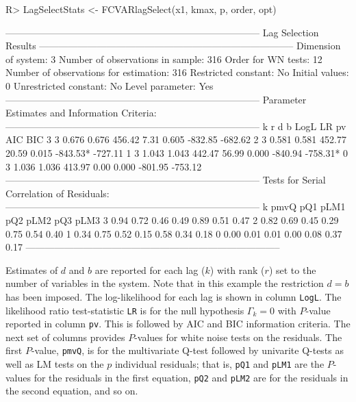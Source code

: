 \documentclass[article]{jss}
\begin{document}
\begin{CodeChunk} 
\begin{CodeInput}
R> LagSelectStats <- FCVARlagSelect(x1, kmax, p, order, opt)
\end{CodeInput}
\begin{CodeOutput}
--------------------------------------------------------------------------------
                        Lag Selection Results 
--------------------------------------------------------------------------------
Dimension of system:       3     Number of observations in sample:          316 
Order for WN tests:       12     Number of observations for estimation:     316 
Restricted constant:      No     Initial values:                              0
Unrestricted constant:    No     Level parameter:                           Yes
--------------------------------------------------------------------------------
Parameter Estimates and Information Criteria:
--------------------------------------------------------------------------------
 k  r    d    b      LogL     LR    pv    AIC       BIC
 3  3 0.676 0.676  456.42   7.31 0.605  -832.85   -682.62 
 2  3 0.581 0.581  452.77  20.59 0.015  -843.53*  -727.11 
 1  3 1.043 1.043  442.47  56.99 0.000  -840.94   -758.31*
 0  3 1.036 1.036  413.97   0.00 0.000  -801.95   -753.12 
--------------------------------------------------------------------------------
Tests for Serial Correlation of Residuals: 
--------------------------------------------------------------------------------
 k   pmvQ  pQ1   pLM1  pQ2   pLM2  pQ3   pLM3
 3   0.94  0.72  0.46  0.49  0.89  0.51  0.47
 2   0.82  0.69  0.45  0.29  0.75  0.54  0.40
 1   0.34  0.75  0.52  0.15  0.58  0.34  0.18
 0   0.00  0.01  0.01  0.00  0.08  0.37  0.17
--------------------------------------------------------------------------------
\end{CodeOutput}
\end{CodeChunk} 

Estimates of $d$ and $b$ are reported for each lag ($k$) with rank ($r$) set to the number of variables in the system. Note that in this example the restriction $d=b$ has been imposed. The log-likelihood for each lag is shown in column \verb|LogL|. The likelihood ratio test-statistic \verb|LR| is for the null hypothesis $\Gamma_k = 0$ with $P$-value reported in column \verb|pv|. This is followed by AIC and BIC information criteria. The next set of columns provides $P$-values for white noise tests on the residuals. The first $P$-value, \verb|pmvQ|, is for the multivariate Q-test followed by univarite Q-tests as well as LM tests on the $p$ individual residuals; that is, \verb|pQ1| and \verb|pLM1| are the $P$-values for the residuals in the first equation, \verb|pQ2| and \verb|pLM2| are for the residuals in the second equation, and so on. 
\end{document}
